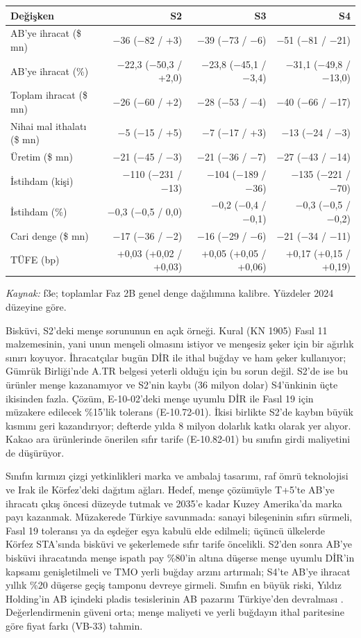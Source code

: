 \begin{longtable}[]{@{}lrrr@{}}
\toprule\noalign{}
\textbf{Değişken} & \textbf{S2} & \textbf{S3} & \textbf{S4} \\
\midrule\noalign{}
\endhead
\bottomrule\noalign{}
\endlastfoot
AB'ye ihracat (\$ mn) & −36 (−82 / +3) & −39 (−73 / −6) & −51 (−81 / −21) \\
AB'ye ihracat (\%) & −22,3 (−50,3 / +2,0) & −23,8 (−45,1 / −3,4) & −31,1 (−49,8 / −13,0) \\
Toplam ihracat (\$ mn) & −26 (−60 / +2) & −28 (−53 / −4) & −40 (−66 / −17) \\
Nihai mal ithalatı (\$ mn) & −5 (−15 / +5) & −7 (−17 / +3) & −13 (−24 / −3) \\
Üretim (\$ mn) & −21 (−45 / −3) & −21 (−36 / −7) & −27 (−43 / −14) \\
İstihdam (kişi) & −110 (−231 / −13) & −104 (−189 / −36) & −135 (−221 / −70) \\
İstihdam (\%) & −0,3 (−0,5 / 0,0) & −0,2 (−0,4 / −0,1) & −0,3 (−0,5 / −0,2) \\
Cari denge (\$ mn) & −17 (−36 / −2) & −16 (−29 / −6) & −21 (−34 / −11) \\
TÜFE (bp) & +0,03 (+0,02 / +0,03) & +0,05 (+0,05 / +0,06) & +0,17 (+0,15 / +0,19) \\
\end{longtable}

\endgroup

\emph{Kaynak:} \etiketT{} f3e; toplamlar Faz 2B genel denge dağılımına kalibre. Yüzdeler 2024 düzeyine göre.

Bisküvi, S2'deki menşe sorununun en açık örneği. Kural (KN 1905) Fasıl 11 malzemesinin, yani unun menşeli olmasını istiyor ve menşesiz şeker için bir ağırlık sınırı koyuyor. İhracatçılar bugün DİR ile ithal buğday ve ham şeker kullanıyor; Gümrük Birliği'nde A.TR belgesi yeterli olduğu için bu sorun değil. S2'de ise bu ürünler menşe kazanamıyor ve S2'nin kaybı (36 milyon dolar) S4'ünkinin üçte ikisinden fazla. Çözüm, E-10-02'deki menşe uyumlu DİR ile Fasıl 19 için müzakere edilecek \%15'lik tolerans (E-10.72-01). İkisi birlikte S2'de kaybın büyük kısmını geri kazandırıyor; defterde yılda 8 milyon dolarlık katkı olarak yer alıyor. Kakao ara ürünlerinde önerilen sıfır tarife (E-10.82-01) bu sınıfın girdi maliyetini de düşürüyor.

Sınıfın kırmızı çizgi yetkinlikleri marka ve ambalaj tasarımı, raf ömrü teknolojisi ve Irak ile Körfez'deki dağıtım ağları. Hedef, menşe çözümüyle T+5'te AB'ye ihracatı çıkış öncesi düzeyde tutmak ve 2035'e kadar Kuzey Amerika'da marka payı kazanmak. Müzakerede Türkiye savunmada: sanayi bileşeninin sıfırı sürmeli, Fasıl 19 toleransı ya da eşdeğer eşya kabulü elde edilmeli; üçüncü ülkelerde Körfez STA'sında bisküvi ve şekerlemede sıfır tarife öncelikli. S2'den sonra AB'ye bisküvi ihracatında menşe ispatlı pay \%80'in altına düşerse menşe uyumlu DİR'in kapsamı genişletilmeli ve TMO yerli buğday arzını artırmalı; S4'te AB'ye ihracat yıllık \%20 düşerse geçiş tamponu devreye girmeli. Sınıfın en büyük riski, Yıldız Holding'in AB içindeki pladis tesislerinin AB pazarını Türkiye'den devralması \etiketH{}. Değerlendirmenin güveni orta; menşe maliyeti ve yerli buğdayın ithal paritesine göre fiyat farkı (VB-33) tahmin.

